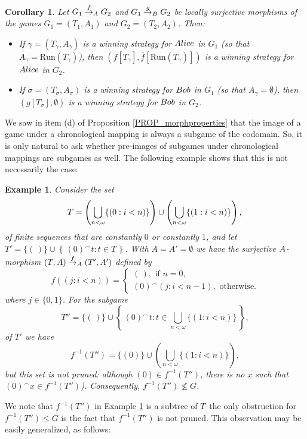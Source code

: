 \documentclass[12pt]{amsart}
\newtheorem{cor}[thm]{Corollary}
\newtheorem{ex}[thm]{Example}
\theoremstyle{definition}
\newcommand{\set}[1]{\left\{\, {#1} \,\right\}}
\newcommand{\seq}[1]{{\left( {#1} \right)}}
\newcommand{\ali}{\textup{\textmd{\textsc{Alice}}}}
\newcommand{\bob}{\textup{\textmd{\textsc{Bob}}}}
\newcommand{\A}{\textup{\textmd{\textsc{A}}}}
\newcommand{\B}{\textup{\textmd{\textsc{B}}}}
\newcommand{\Run}{{\mathrm{Run}}}
\begin{document}
\begin{cor}\label{LEMMA_StratImage}
	Let $G_1\stackrel{f}{\to}_\A G_2$ and $G_1\stackrel{g}{\to}_\B G_2$ be locally surjective morphisms of the games $G_1=(T_1,A_1)$ and $G_2=(T_2,A_2)$. Then:
	\begin{itemize}
		\item[(a)] If $\gamma=(T_\gamma,A_\gamma)$ is a winning strategy for $\ali$ in $G_1$ (so that $A_{\gamma}=\Run(T_{\gamma})$), then $(f[T_\gamma], \overline{f}[\Run(T_\gamma)])$ is a winning strategy for $\ali$ in $G_2$.
		\item[(b)] If $\sigma =(T_\sigma,A_\sigma)$ is a winning strategy for $\bob$ in $G_1$ (so that $A_{\gamma}=\emptyset$), then $(g[T_\sigma], \emptyset)$ is a winning strategy for $\bob$ in $G_2$. 
	\end{itemize}
\end{cor}


We saw in item (d) of Proposition \ref{PROP_morphproperties} that the image of a game under a chronological mapping is always a subgame of the codomain. So, it is only natural to ask whether pre-images of subgames under chronological mappings are subgames as well. The following example shows that this is not necessarily the case:


\begin{ex}\label{EX_PreImgNotSub}
	Consider the set
	\[
	T =  \left(\bigcup_{n<\omega}\{\seq{0:i< n}\}\right) \cup \left(\bigcup_{n<\omega}\{\seq{1:i< n}\}\right),\\
	\]
	of finite sequences that are constantly $0$ or constantly $1$, and let $T' = \{\seq{\,}\}\cup\set{\seq{0}^\smallfrown t: t\in  T}$. With $A=A'=\emptyset$
	we have the surjective $\A$-morphism $(T,A)\stackrel{f}{\to}_\A(T',A')$ defined by
	\[
	f(\seq{j:i< n})=\begin{cases}
		\seq{\,}, \text{ if $n=0$,}\\
		\seq{0}^\smallfrown\seq{j:i< n-1}, \text{ otherwise.}
	\end{cases}
	\]
	where $j\in\{0,1\}$. For the subgame
	\[
	T''=\{\seq{\,}\}\cup\set{\seq{0}^\smallfrown t: t\in  \bigcup_{n<\omega}\{\seq{1:i< n}\}},
	\]
	of $T'$ we have 
	\[
	f^{-1}(T'')=\{\seq{0}\}\cup \left(\bigcup_{n<\omega}\{\seq{1:i<n}\}\right),
	\]
	but this set is not pruned: although $\seq{0}\in f^{-1}(T'')$, there is no $x$ such that $\seq{0}^\smallfrown x \in f^{-1}(T'')$). Consequently, $f^{-1}(T'')\not\le G$.
\end{ex}


We note that $f^{-1}(T'')$ in Example \ref{EX_PreImgNotSub} is a subtree of $T$--the only obstruction for $f^{-1}(T'')\le G$ is the fact that $f^{-1}(T'')$ is not pruned. This observation may be easily generalized, as follows:
\end{document}
